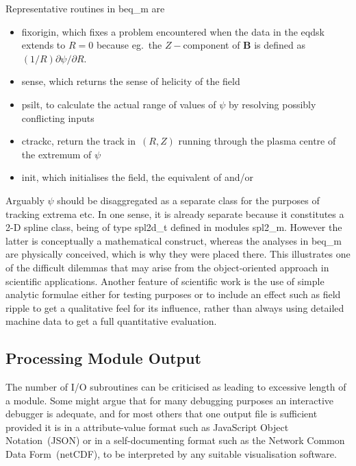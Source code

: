 Representative routines in beq\_m are
\begin{itemize}
\item fixorigin, which fixes a problem encountered when the data in
the eqdsk extends to $R=0$ because eg.\ the $Z-$component of ${\mathbf B}$ is defined as $(1/R) \partial\psi/ \partial R$.
\item sense, which returns the sense of helicity of the field
\item psilt, to calculate the actual range of values of $\psi$ by resolving possibly conflicting inputs
\item ctrackc, return the track in~$(R,Z)$ running through the plasma centre of the extremum of $\psi$
\item init, which initialises the field, the equivalent of  and/or 
\end{itemize}
Arguably $\psi$ should be disaggregated as a separate class for the purposes
of tracking extrema etc. In one sense, it is already separate because  it constitutes a
2-D spline class, being of type spl2d\_t defined in modules spl2\_m. 
However the latter is conceptually a mathematical construct, whereas the analyses in beq\_m are
physically conceived, which is why they were placed there. This illustrates one of the difficult dilemmas
that may arise from the object-oriented approach in scientific applications. Another feature
of scientific work is the use of simple analytic formulae either for testing purposes 
or to include an effect such as field ripple to get a qualitative feel for its influence,
rather than always using detailed machine data to get a full quantitative evaluation.


\subsection{Processing Module Output}\label{sec:procio}
The number of I/O subroutines can be criticised as leading to excessive length
of a module. Some might argue that for many debugging purposes an interactive debugger is adequate,
and for most others that one output file is sufficient provided it is in a attribute-value
format such as JavaScript Object Notation~(JSON) or in a self-documenting format such as the 
Network Common Data Form~(netCDF), to be interpreted by any suitable visualisation software.

